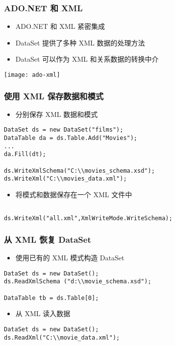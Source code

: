 \begin{frame}
\frametitle{ADO.NET 和 XML}
\begin{itemize}
\item ADO.NET 和 XML 紧密集成
\item DataSet 提供了多种 XML 数据的处理方法
\item DataSet 可以作为 XML 和关系数据的转换中介
\end{itemize}
\begin{center}
  \texttt{[image: ado-xml]}
\end{center}
\end{frame}

\begin{frame}[fragile]
\frametitle{使用 XML 保存数据和模式}
\begin{itemize}
\item 分别保存 XML 数据和模式
\end{itemize}
\begin{lstlisting}
DataSet ds = new DataSet("films");
DataTable da = ds.Table.Add("Movies");
...
da.Fill(dt);

ds.WriteXmlSchema("C:\\movies_schema.xsd");
ds.WriteXml("C:\\movies_data.xml");

\end{lstlisting}
\begin{itemize}
\item 将模式和数据保存在一个 XML 文件中
\end{itemize}
\begin{lstlisting}

ds.WriteXml("all.xml",XmlWriteMode.WriteSchema);

\end{lstlisting}
\end{frame}

\begin{frame}[fragile]
\frametitle{从 XML 恢复 DataSet}
\begin{itemize}
\item 使用已有的 XML 模式构造 DataSet
\end{itemize}
\begin{lstlisting}
DataSet ds = new DataSet();
ds.ReadXmlSchema ("d:\\movie_schema.xsd");

DataTable tb = ds.Table[0];
\end{lstlisting}
\begin{itemize}
\item 从 XML 读入数据
\end{itemize}
\begin{lstlisting}
DataSet ds = new DataSet();
ds.ReadXml("C:\\movie_data.xml");

\end{lstlisting}
\end{frame}

